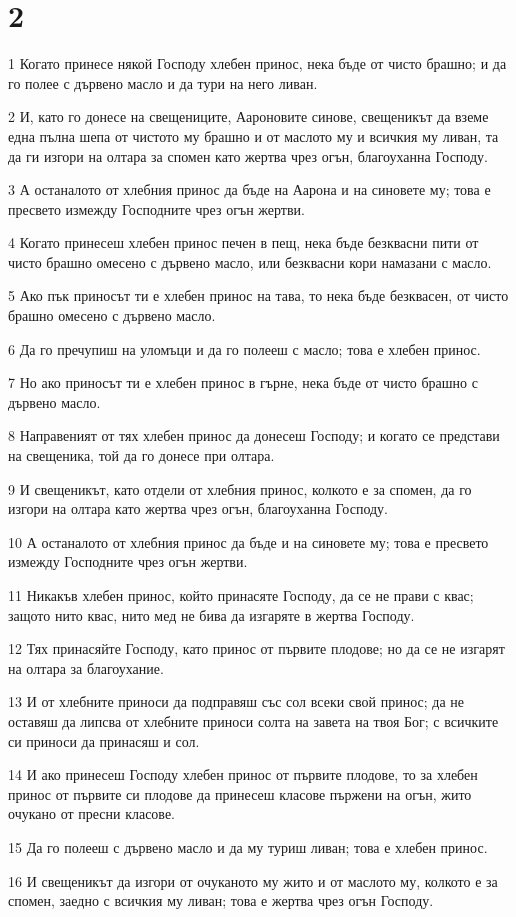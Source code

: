 \chapter{2}

\par 1 Когато принесе някой Господу хлебен принос, нека бъде от чисто брашно; и да го полее с дървено масло и да тури на него ливан.
\par 2 И, като го донесе на свещениците, Аароновите синове, свещеникът да вземе една пълна шепа от чистото му брашно и от маслото му и всичкия му ливан, та да ги изгори на олтара за спомен като жертва чрез огън, благоуханна Господу.
\par 3 А останалото от хлебния принос да бъде на Аарона и на синовете му; това е пресвето измежду Господните чрез огън жертви.
\par 4 Когато принесеш хлебен принос печен в пещ, нека бъде безквасни пити от чисто брашно омесено с дървено масло, или безквасни кори намазани с масло.
\par 5 Ако пък приносът ти е хлебен принос на тава, то нека бъде безквасен, от чисто брашно омесено с дървено масло.
\par 6 Да го пречупиш на уломъци и да го полееш с масло; това е хлебен принос.
\par 7 Но ако приносът ти е хлебен принос в гърне, нека бъде от чисто брашно с дървено масло.
\par 8 Направеният от тях хлебен принос да донесеш Господу; и когато се представи на свещеника, той да го донесе при олтара.
\par 9 И свещеникът, като отдели от хлебния принос, колкото е за спомен, да го изгори на олтара като жертва чрез огън, благоуханна Господу.
\par 10 А останалото от хлебния принос да бъде и на синовете му; това е пресвето измежду Господните чрез огън жертви.
\par 11 Никакъв хлебен принос, който принасяте Господу, да се не прави с квас; защото нито квас, нито мед не бива да изгаряте в жертва Господу.
\par 12 Тях принасяйте Господу, като принос от първите плодове; но да се не изгарят на олтара за благоухание.
\par 13 И от хлебните приноси да подправяш със сол всеки свой принос; да не оставяш да липсва от хлебните приноси солта на завета на твоя Бог; с всичките си приноси да принасяш и сол.
\par 14 И ако принесеш Господу хлебен принос от първите плодове, то за хлебен принос от първите си плодове да принесеш класове пържени на огън, жито очукано от пресни класове.
\par 15 Да го полееш с дървено масло и да му туриш ливан; това е хлебен принос.
\par 16 И свещеникът да изгори от очуканото му жито и от маслото му, колкото е за спомен, заедно с всичкия му ливан; това е жертва чрез огън Господу.

